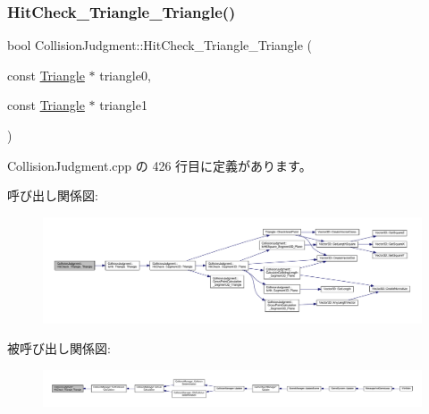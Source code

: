 \subsubsection{\texorpdfstring{Hit\+Check\+\_\+\+Triangle\+\_\+\+Triangle()}{HitCheck\_Triangle\_Triangle()}}
{\footnotesize\ttfamily bool Collision\+Judgment\+::\+Hit\+Check\+\_\+\+Triangle\+\_\+\+Triangle (\begin{DoxyParamCaption}\item[{const \mbox{\hyperlink{class_triangle}{Triangle}} $\ast$}]{triangle0,  }\item[{const \mbox{\hyperlink{class_triangle}{Triangle}} $\ast$}]{triangle1 }\end{DoxyParamCaption})\hspace{0.3cm}{\ttfamily [static]}}



 Collision\+Judgment.\+cpp の 426 行目に定義があります。

呼び出し関係図\+:\nopagebreak
\begin{figure}[H]
\begin{center}
\leavevmode
\includegraphics[width=350pt]{class_collision_judgment_ab33b8936e62bdb9b6cf6f3d383c033b9_cgraph}
\end{center}
\end{figure}
被呼び出し関係図\+:
\nopagebreak
\begin{figure}[H]
\begin{center}
\leavevmode
\includegraphics[width=350pt]{class_collision_judgment_ab33b8936e62bdb9b6cf6f3d383c033b9_icgraph}
\end{center}
\end{figure}
\mbox{\label{class_collision_judgment_af4da6d6923d8ee57253b1e86436e6ec5}} 
